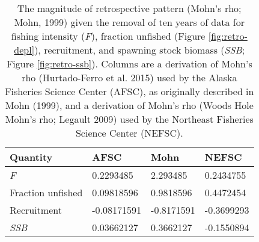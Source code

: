 
\begin{longtable}[t]{llll}
\caption{\label{tab:RetroMohnsrho}The magnitude of retrospective pattern (Mohn's rho; Mohn, 1999) given the removal of ten years of data for fishing intensity (\emph{F}), fraction unfished (Figure \ref{fig:retro-depl}),  recruitment, and spawning stock biomass (\emph{SSB}; Figure \ref{fig:retro-ssb}). Columns are a derivation of Mohn's rho (Hurtado-Ferro et al. 2015) used by the Alaska Fisheries Science Center (AFSC), as originally described in Mohn (1999), and a derivation of Mohn's rho (Woods Hole Mohn's rho; Legault 2009) used by the Northeast Fisheries Science Center (NEFSC).}\\
\toprule
Quantity & AFSC & Mohn & NEFSC\\
\midrule
\emph{F} & 0.2293485 & 2.293485 & 0.2434755\\
Fraction unfished & 0.09818596 & 0.9818596 & 0.4472454\\
Recruitment & -0.08171591 & -0.8171591 & -0.3699293\\
\emph{SSB} & 0.03662127 & 0.3662127 & -0.1550894\\
\bottomrule
\end{longtable}
